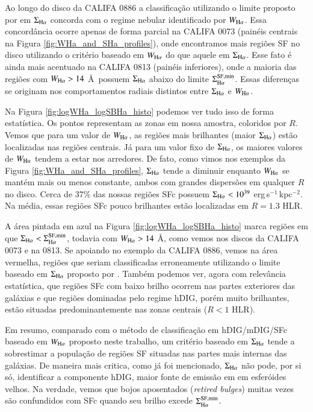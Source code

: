 Ao longo do disco da CALIFA 0886 a classificação utilizando o limite proposto por \citet{Zhang.etal.2017a} em $\Sigma_{\Ha}$ concorda com o regime nebular identificado por $W_{\Ha}$. Essa concordância ocorre apenas de forma parcial na CALIFA 0073 (painéis centrais na Figura \ref{fig:WHa_and_SHa_profiles}), onde encontramos mais regiões SF no disco utilizando o critério baseado em $W_{\Ha}$ do que aquele em $\Sigma_{\Ha}$. Esse fato é ainda mais acentuado na CALIFA 0813 (painéis inferiores), onde a maioria das regiões com $W_{\Ha} > 14$ \AA\ possuem $\Sigma_{\Ha}$ abaixo do limite $\Sigma^{\rm SF,min}_{\Ha}$. Essas diferenças se originam nos comportamentos radiais distintos entre $\Sigma_{\Ha}$ e $W_{\Ha}$.

Na Figura \ref{fig:logWHa_logSBHa_histo} podemos ver tudo isso de forma estatística. Os pontos representam as zonas em nossa amostra, coloridos por $R$. Vemos que para um valor de $W_{\Ha}$, as regiões mais brilhantes (maior $\Sigma_{\Ha}$) estão localizadas nas regiões centrais. Já para um valor fixo de $\Sigma_{\Ha}$, os maiores valores de $W_{\Ha}$ tendem a estar nos arredores. De fato, como vimos nos exemplos da Figura \ref{fig:WHa_and_SHa_profiles}, $\Sigma_{\Ha}$ tende a diminuir enquanto $W_{\Ha}$ se mantém mais ou menos constante, ambos com grandes dispersões em qualquer $R$ no disco. Cerca de 37\% das nossas regiões SFc possuem $\Sigma_{\Ha} < 10^{39}$ erg$\,$s$^{-1}\,$kpc$^{-2}$. Na média, essas regiões SFc pouco brilhantes estão localizadas em $R = 1.3$ HLR.

A área pintada em azul na Figura \ref{fig:logWHa_logSBHa_histo} marca regiões em que $\Sigma_{\Ha} < \Sigma^{\rm SF,min}_{\Ha}$, todavia com $W_{\Ha} > 14$ \AA, como vemos nos discos da CALIFA 0073 e na 0813. Se apoiando no exemplo da CALIFA 0886, vemos na área vermelha, regiões que seriam classificadas erroneamente utilizando o limite baseado em $\Sigma_{\Ha}$ proposto por \citet{Zhang.etal.2017a}.
Também podemos ver, agora com relevância estatística, que regiões SFc com baixo brilho ocorrem nas partes exteriores das galáxias e que regiões dominadas pelo regime hDIG, porém muito brilhantes, estão situadas predominantemente nas zonas centrais ($R < 1$ HLR).

Em resumo, comparado com o método de classificação em hDIG/mDIG/SFc baseado em $W_{\Ha}$ proposto neste trabalho, um critério baseado em $\Sigma_{\Ha}$ tende a sobrestimar a população de regiões SF situadas nas partes mais internas das galáxias. De maneira mais critica, como já foi mencionado, $\Sigma_{\Ha}$ não pode, por si só, identificar a componente hDIG, maior fonte de emissão em \Ha em  esferóides velhos. Na verdade, vemos que bojos aposentados ({\em retired bulges}) muitas vezes são confundidos com SFc quando seu brilho excede $\Sigma^{\rm SF,min}_{\Ha}$.

